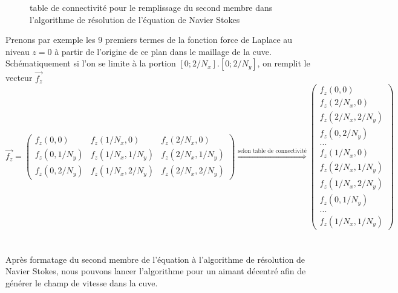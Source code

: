 \documentclass[a4paper,12pt,titlepage]{report}
\begin{document}
\begin{onehalfspace}
\begin{figure}[!h]
\caption{\label{figure 3 } table de connectivité pour le remplissage du second membre dans l'algorithme de résolution de l'équation de Navier Stokes}
\end{figure}
\newline
\newline
\newline
\newline
\newline
\newline
\newline
\newline
\newline
\newline
\newline
\newline
\newline
\newline
\newline
\newline
Prenons par exemple les 9 premiers termes de la fonction force de Laplace au niveau $z=0$ à partir de l'origine de ce plan dans le maillage de la cuve. Schématiquement si l'on se limite à la portion $[0;2/N_x].[0;2/N_y]$, on remplit le vecteur $\vec{f_z}$
\\
\[
\vec{f_z}=
\left(
\begin{array}{ccc}
  f_z(0,0) & f_z(1/N_x,0) & f_z(2/N_x ,0)\\
  f_z(0,1/N_y) & f_z(1/N_x,1/N_y) & f_z(2/N_x ,1/N_y) \\
  f_z(0,2/N_y) &  f_z(1/N_x,2/N_y) & f_z(2/N_x,2/N_y )
\end{array}
\right) \overset{\text{selon table de connectivité}}{\Longrightarrow}
\left(
\begin{array}{ccc}
  f_z(0,0)     \\
  f_z(2/N_x ,0)      \\
      f_z(2/N_x,2/N_y )  \\
     f_z(0,2/N_y)\\ 
  ...\\
  f_z(1/N_x,0)\\
   f_z(2/N_x ,1/N_y)\\
   f_z(1/N_x,2/N_y) \\
   f_z(0,1/N_y)\\
   ... \\
    f_z(1/N_x,1/N_y)
\end{array}
\right)
\]
\\
\\
Après formatage du second membre de l'équation à l'algorithme de résolution de Navier Stokes, nous pouvons lancer l'algorithme pour un aimant décentré afin de générer le champ de vitesse dans la cuve. 

\end{onehalfspace}
\end{document}
